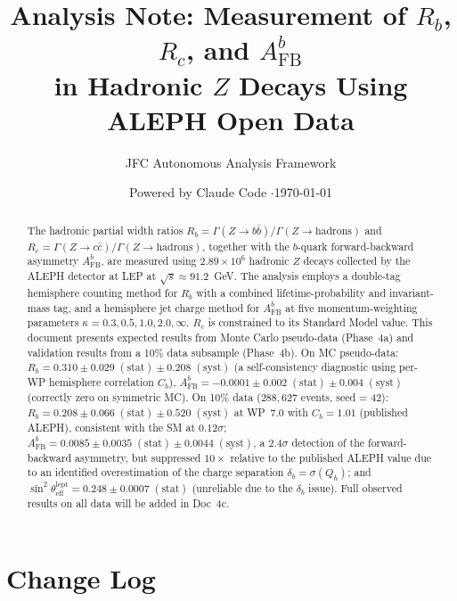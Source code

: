 \documentclass[11pt,a4paper]{article}
\title{Analysis Note: Measurement of $R_b$, $R_c$, and $A_\mathrm{FB}^b$\\
in Hadronic $Z$ Decays Using ALEPH Open Data}
\author{JFC Autonomous Analysis Framework}
\date{Powered by Claude Code \quad$\cdot$\quad \today}
\begin{document}
\maketitle

\begin{abstract}
The hadronic partial width ratios $R_b = \Gamma(Z \to b\bar{b})/\Gamma(Z \to \mathrm{hadrons})$
and $R_c = \Gamma(Z \to c\bar{c})/\Gamma(Z \to \mathrm{hadrons})$, together with the
$b$-quark forward-backward asymmetry $A_\mathrm{FB}^b$, are measured using $2.89 \times 10^6$
hadronic $Z$ decays collected by the ALEPH detector at LEP at $\sqrt{s} \approx 91.2$~GeV.
The analysis employs a double-tag hemisphere counting method for $R_b$ with a combined
lifetime-probability and invariant-mass tag, and a hemisphere jet charge method for
$A_\mathrm{FB}^b$ at five momentum-weighting parameters $\kappa = 0.3, 0.5, 1.0, 2.0, \infty$.
$R_c$ is constrained to its Standard Model value.
This document presents expected results from Monte Carlo pseudo-data (Phase~4a)
and validation results from a 10\% data subsample (Phase~4b).
On MC pseudo-data:
$R_b = 0.310 \pm 0.029\;\mathrm{(stat)} \pm 0.208\;\mathrm{(syst)}$
(a self-consistency diagnostic using per-WP hemisphere correlation $C_b$),
$A_\mathrm{FB}^b = -0.0001 \pm 0.002\;\mathrm{(stat)} \pm 0.004\;\mathrm{(syst)}$
(correctly zero on symmetric MC).
On 10\% data ($288{,}627$ events, seed = 42):
$R_b = 0.208 \pm 0.066\;\mathrm{(stat)} \pm 0.520\;\mathrm{(syst)}$
at WP~7.0 with $C_b = 1.01$ (published ALEPH), consistent with the SM at $0.12\sigma$;
$A_\mathrm{FB}^b = 0.0085 \pm 0.0035\;\mathrm{(stat)} \pm 0.0044\;\mathrm{(syst)}$,
a $2.4\sigma$ detection of the forward-backward asymmetry, but suppressed $10\times$
relative to the published ALEPH value due to an identified overestimation of the
charge separation $\delta_b = \sigma(Q_h)$;
and $\sin^2\theta_\mathrm{eff}^\mathrm{lept} = 0.248 \pm 0.0007\;\mathrm{(stat)}$
(unreliable due to the $\delta_b$ issue).
Full observed results on all data will be added in Doc~4c.
\end{abstract}

\tableofcontents
\clearpage

\section*{Change Log}
\end{document}
